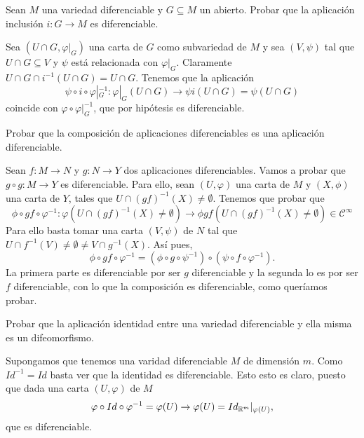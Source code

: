 \documentclass[twoside]{article}
\begin{document}
\newpage

\begin{ejercicio}{2}
Sean $M$ una variedad diferenciable y $G \subseteq M$ un abierto. Probar que la
aplicación inclusión $i : G \to M$ es diferenciable.
\end{ejercicio}
\begin{solucion}
Sea $(U\cap G,\varphi|_G)$ una carta de $G$ como subvariedad de $M$ y sea $(V,\psi)$ tal que $U\cap G\subseteq V$ y $\psi$ está relacionada con $\varphi|_G$. Claramente $U\cap G\cap i^{-1}(U\cap G)=U\cap G$. Tenemos que la aplicación 
$$\psi\circ i\circ\varphi|_G^{-1}:\varphi|_G(U\cap G)\to \psi i(U\cap G)=\psi(U\cap G)$$
coincide con $\varphi\circ\varphi|_G^{-1}$, que por hipótesis es diferenciable.
\end{solucion}

\newpage

\begin{ejercicio}{3}
Probar que la composición de aplicaciones diferenciables es una aplicación
diferenciable.
\end{ejercicio}
\begin{solucion}
Sean $f:M\to N$ y $g:N\to Y$ dos aplicaciones diferenciables. Vamos a probar que $g\circ g:M\to Y$ es diferenciable. Para ello, sean $(U,\varphi)$ una carta de $M$ y $(X,\phi)$ una carta de $Y$, tales que $U\cap (gf)^{-1}(X)\neq\emptyset$. Tenemos que probar que
$$\phi\circ gf\circ \varphi^{-1}:\varphi(U\cap (gf)^{-1}(X)\neq\emptyset)\to \phi gf(U\cap (gf)^{-1}(X)\neq\emptyset)\in\mathcal{C}^\infty$$
Para ello basta tomar una carta $(V,\psi)$ de $N$ tal que $U\cap f^{-1}(V)\neq\emptyset\neq V\cap g^{-1}(X)$. Así pues,
$$\phi\circ gf\circ \varphi^{-1}=(\phi\circ g\circ\psi^{-1})\circ(\psi\circ f\circ \varphi^{-1}).$$
La primera parte es diferenciable por ser $g$ diferenciable y la segunda lo es por ser $f$ diferenciable, con lo que la composición es diferenciable, como queríamos probar.
\end{solucion}

\newpage

\begin{ejercicio}{4}
Probar que la aplicación identidad entre una variedad diferenciable y ella
misma es un difeomorfismo.
\end{ejercicio}
\begin{solucion}
Supongamos que tenemos una varidad diferenciable $M$ de dimensión $m$. Como $Id^{-1}=Id$ basta ver que la identidad es diferenciable. Esto esto es claro, puesto que dada una carta $(U,\varphi)$ de $M$ 
$$\varphi\circ Id\circ\varphi^{-1}=\varphi(U)\to\varphi(U)=Id_{\mathbb{R}^m}|_{\varphi(U)},$$
que es diferenciable.
\end{solucion}
\end{document}
